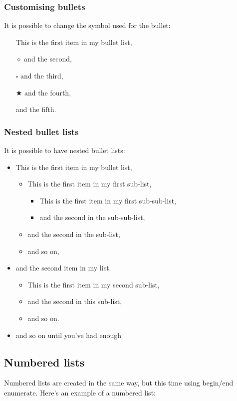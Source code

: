 \documentclass[a4paper,11pt]{article}
\begin{document}
\subsubsection{Customising bullets}

It is possible to change the symbol used for the bullet:
\begin{itemize}
\item[\checkmark] This is the first item in my bullet list,
\item[$\diamond$] and the second,
\item[$\square$] and the third,
\item[$\bigstar$] and the fourth,
\item[\pointer] and the fifth.
\end{itemize}


\subsubsection{Nested bullet lists}

It is possible to have nested bullet lists:
\begin{itemize}
\item This is the first item in my bullet list,
	\begin{itemize}
	\item This is the first item in my first sub-list,
		\begin{itemize}
		\item This is the first item in my first sub-sub-list,
		\item and the second in the sub-sub-list,
		\end{itemize}
	\item and the second in the sub-list,
	\item and so on,
	\end{itemize}
\item and the second item in my list.
	\begin{itemize}
	\item This is the first item in my second sub-list,
	\item and the second in this sub-list,
	\item and so on.
	\end{itemize}
\item and so on until you've had enough
\end{itemize}


\subsection{Numbered lists}
Numbered lists are created in the same way, but this time using begin/end enumerate. Here's an example of a numbered list:
\end{document}
